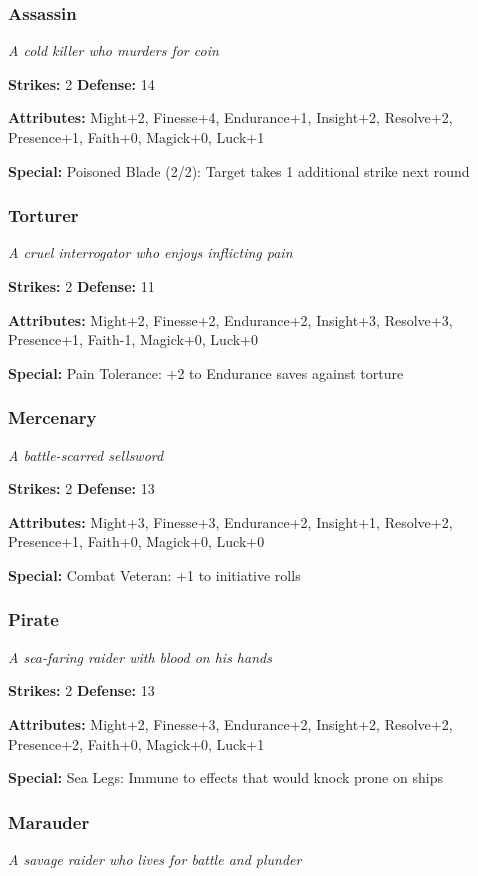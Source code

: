 \documentclass[10pt,twoside]{article}
\begin{document}
\subsubsection{Assassin}
\textit{A cold killer who murders for coin}

\textbf{Strikes:} 2 \quad \textbf{Defense:} 14

\textbf{Attributes:} Might+2, Finesse+4, Endurance+1, Insight+2, Resolve+2, Presence+1, Faith+0, Magick+0, Luck+1

\textbf{Special:} Poisoned Blade (2/2): Target takes 1 additional strike next round

\subsubsection{Torturer}
\textit{A cruel interrogator who enjoys inflicting pain}

\textbf{Strikes:} 2 \quad \textbf{Defense:} 11

\textbf{Attributes:} Might+2, Finesse+2, Endurance+2, Insight+3, Resolve+3, Presence+1, Faith-1, Magick+0, Luck+0

\textbf{Special:} Pain Tolerance: +2 to Endurance saves against torture

\subsubsection{Mercenary}
\textit{A battle-scarred sellsword}

\textbf{Strikes:} 2 \quad \textbf{Defense:} 13

\textbf{Attributes:} Might+3, Finesse+3, Endurance+2, Insight+1, Resolve+2, Presence+1, Faith+0, Magick+0, Luck+0

\textbf{Special:} Combat Veteran: +1 to initiative rolls

\subsubsection{Pirate}
\textit{A sea-faring raider with blood on his hands}

\textbf{Strikes:} 2 \quad \textbf{Defense:} 13

\textbf{Attributes:} Might+2, Finesse+3, Endurance+2, Insight+2, Resolve+2, Presence+2, Faith+0, Magick+0, Luck+1

\textbf{Special:} Sea Legs: Immune to effects that would knock prone on ships

\subsubsection{Marauder}
\textit{A savage raider who lives for battle and plunder}
\end{document}
